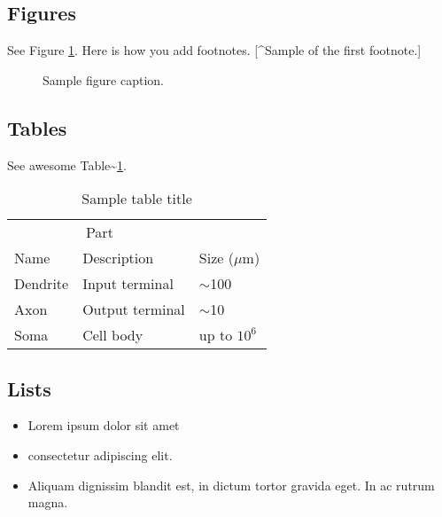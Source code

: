 \documentclass{article}
\begin{document}
\hypertarget{figures}{%
\subsection{Figures}\label{figures}}

\lipsum[10]

See Figure \ref{fig:fig1}. Here is how you add footnotes. {[}\^{}Sample
of the first footnote.{]}

\lipsum[11]

\begin{figure}
  \centering
  \fbox{\rule[-.5cm]{4cm}{4cm} \rule[-.5cm]{4cm}{0cm}}
  \caption{Sample figure caption.}
  \label{fig:fig1}
\end{figure}

\hypertarget{tables}{%
\subsection{Tables}\label{tables}}

\lipsum[12]

See awesome Table\textasciitilde{}\ref{tab:table}.

\begin{table}
 \caption{Sample table title}
  \centering
  \begin{tabular}{lll}
    \toprule
    \multicolumn{2}{c}{Part}                   \\
    \cmidrule(r){1-2}
    Name     & Description     & Size ($\mu$m) \\
    \midrule
    Dendrite & Input terminal  & $\sim$100     \\
    Axon     & Output terminal & $\sim$10      \\
    Soma     & Cell body       & up to $10^6$  \\
    \bottomrule
  \end{tabular}
  \label{tab:table}
\end{table}

\hypertarget{lists}{%
\subsection{Lists}\label{lists}}

\begin{itemize}
\tightlist
\item
  Lorem ipsum dolor sit amet
\item
  consectetur adipiscing elit.
\item
  Aliquam dignissim blandit est, in dictum tortor gravida eget. In ac
  rutrum magna.
\end{itemize}
\end{document}
